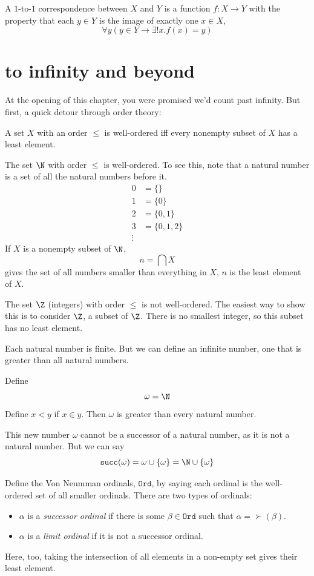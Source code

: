 \message{ !name(truth.tex)}\documentclass{scrbook}
\renewcommand{\implies}{\to}
\newcommand{\ord}{\texttt{Ord}}
\begin{document}
\begin{defn}[$1$-to-$1$ correspondence]
  A $1$-to-$1$ correspondence between $X$ and $Y$ is a function $f:X\to Y$ with the property that each $y\in Y$ is the image of exactly one $x\in X$, \ie 
  \[
  \forall y (y\in Y\implies \exists! x . f(x)=y)
  \]
\end{defn}

\section[To infinity and beyond]{to infinity and beyond}
At the opening of this chapter, you were promised we'd count past infinity. But first, a quick detour through order theory: 
\begin{defn}
  \label{def:well-ordered}
  A set $X$ with an order $\leq$ is well-ordered iff every nonempty subset of $X$ has a least element. 
\end{defn}
\begin{example}
  The set $\N$ with order $\leq$ is well-ordered. To see this, note that a natural number is a set of all the natural numbers before it.
  \begin{align*}
    0 &= \{\} \\
    1 &= \{0\}\\
    2 &= \{0,1\}\\
    3 &= \{0,1,2\}\\
    \vdots 
  \end{align*}
  If $X$ is a nonempty subset of $\N$,
  \[
  n=\bigcap X
  \]
  gives the set of all numbers smaller than everything in $X$, \ie $n$ is the least element of $X$. 
\end{example}
\begin{example}
  The set $\Z$ (integers) with order $\leq$ is not well-ordered. The easiest way to show this is to consider $\Z$, a subset of $\Z$. There is no smallest integer, so this subset has no least element. 
\end{example}
Each natural number is finite. But we can define an infinite number, one that is greater than all natural numbers.
\begin{defn}[\omega]
  Define
  \[
  \omega=\N
  \]
  Define $x<y$ if $x\in y$. Then $\omega$ is greater than every natural number. 
\end{defn}
This new number $\omega$ cannot be a successor of a natural number, as it is not a natural number. But we can say
\[
\succ(\omega) = \omega \cup \{\omega\} = \N \cup \{\omega\}
\]
\begin{defn}[ordinals]
  Define the Von Neumman ordinals, $\ord$, by saying each ordinal is the well-ordered set of all smaller ordinals. There are two types of ordinals:
  \begin{itemize}
  \item $\alpha$ is a \emph{successor ordinal} if there is some $\beta \in \ord$ such that $\alpha=\succ(\beta)$. 
  \item $\alpha$ is a \emph{limit ordinal} if it is not a successor ordinal. 
  \end{itemize}
  Here, too, taking the intersection of all elements in a non-empty set gives their least element. 
\end{defn}
\end{document}
